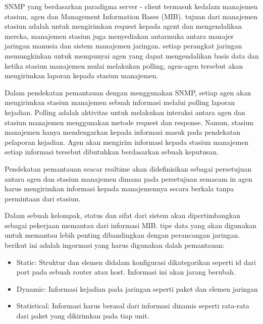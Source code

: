 			SNMP yang berdasarkan paradigma server - client termasuk kedalam manajemen stasiun, agen dan Management Information Bases (MIB). tujuan dari manajemen stasiun adalah untuk mengirimkan request kepada agent dan mengendalikan mereka, manajemen stasiun juga menyediakan antarmuka antara manajer jaringan manusia dan sistem manajemen jaringan. setiap perangkat jaringan memungkinkan untuk mempunyai agen yang dapat mengendalikan basis data dan ketika stasiun manajemen mulai melakukan polling, agen-agen tersebut akan mengirimkan laporan kepada stasiun manajemen.
			
			Dalam pendekatan pemantauan dengan menggunakan SNMP, setiap agen akan mengirimkan stasiun manajemen sebuah informasi melalui polling laporan kejadian. Polling adalah aktivitas untuk melakukan interaksi antara agen dan stasiun manajemen menggunakan metode request dan response. Namun, stasiun manajemen hanya mendengarkan kepada informasi masuk pada pendekatan pelaporan kejadian. Agen akan mengirim informasi kepada stasiun manajemen setiap informasi tersebut dibutuhkan berdasarkan sebuah keputusan.
			
			Pendekatan pemantauan seacar realtime akan didefinisikan sebagai persetujuan antara agen dan stasiun manajemen dimana pada persetujuan semacam in agen harus mengirimkan informasi kepada manajemennya secara berkala tanpa permintaan dari stasiun.
			
			Dalam sebuah kelompak, status dan sifat dari sistem akan dipertimbangkan sebagai pekerjaan memantau dari informasi MIB. tipe data yang akan digunakan untuk memantau lebih penting dibandingkan dengan perancangan jaringan. berikut ini adalah ingormasi yang harus digunakan dalah pemantauan:
			\begin{itemize}
				\item Static: Struktur dan elemen didalam konfigurasi dikategorikan seperti id dari port pada sebuah router atau host. Informasi ini akan jarang berubah.
				\item Dynamic: Informasi kejadian pada jaringan seperti paket dan elemen jaringan
				\item Statistical: Informasi harus berasal dari informasi dinamis seperti rata-rata dari paket yang dikirimkan pada tiap unit.
			\end{itemize}
